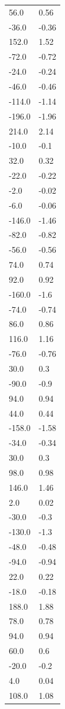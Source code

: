 \begin{longtable}{ll}
56.0 & 0.56 \\
-36.0 & -0.36 \\
152.0 & 1.52 \\
-72.0 & -0.72 \\
-24.0 & -0.24 \\
-46.0 & -0.46 \\
-114.0 & -1.14 \\
-196.0 & -1.96 \\
214.0 & 2.14 \\
-10.0 & -0.1 \\
32.0 & 0.32 \\
-22.0 & -0.22 \\
-2.0 & -0.02 \\
-6.0 & -0.06 \\
-146.0 & -1.46 \\
-82.0 & -0.82 \\
-56.0 & -0.56 \\
74.0 & 0.74 \\
92.0 & 0.92 \\
-160.0 & -1.6 \\
-74.0 & -0.74 \\
86.0 & 0.86 \\
116.0 & 1.16 \\
-76.0 & -0.76 \\
30.0 & 0.3 \\
-90.0 & -0.9 \\
94.0 & 0.94 \\
44.0 & 0.44 \\
-158.0 & -1.58 \\
-34.0 & -0.34 \\
30.0 & 0.3 \\
98.0 & 0.98 \\
146.0 & 1.46 \\
2.0 & 0.02 \\
-30.0 & -0.3 \\
-130.0 & -1.3 \\
-48.0 & -0.48 \\
-94.0 & -0.94 \\
22.0 & 0.22 \\
-18.0 & -0.18 \\
188.0 & 1.88 \\
78.0 & 0.78 \\
94.0 & 0.94 \\
60.0 & 0.6 \\
-20.0 & -0.2 \\
4.0 & 0.04 \\
108.0 & 1.08 \\

\end{longtable}
